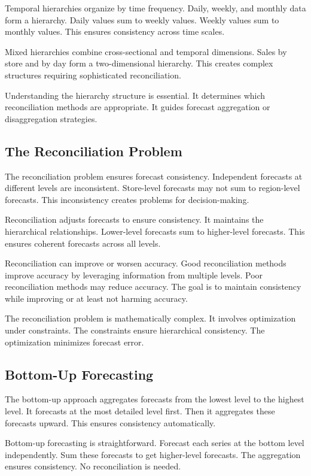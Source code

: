 Temporal hierarchies organize by time frequency. Daily, weekly, and monthly data form a hierarchy. Daily values sum to weekly values. Weekly values sum to monthly values. This ensures consistency across time scales.

Mixed hierarchies combine cross-sectional and temporal dimensions. Sales by store and by day form a two-dimensional hierarchy. This creates complex structures requiring sophisticated reconciliation.

Understanding the hierarchy structure is essential. It determines which reconciliation methods are appropriate. It guides forecast aggregation or disaggregation strategies.

\subsection{The Reconciliation Problem}

The reconciliation problem ensures forecast consistency. Independent forecasts at different levels are inconsistent. Store-level forecasts may not sum to region-level forecasts. This inconsistency creates problems for decision-making.

Reconciliation adjusts forecasts to ensure consistency. It maintains the hierarchical relationships. Lower-level forecasts sum to higher-level forecasts. This ensures coherent forecasts across all levels.

Reconciliation can improve or worsen accuracy. Good reconciliation methods improve accuracy by leveraging information from multiple levels. Poor reconciliation methods may reduce accuracy. The goal is to maintain consistency while improving or at least not harming accuracy.

The reconciliation problem is mathematically complex. It involves optimization under constraints. The constraints ensure hierarchical consistency. The optimization minimizes forecast error.

\subsection{Bottom-Up Forecasting}

The bottom-up approach aggregates forecasts from the lowest level to the highest level. It forecasts at the most detailed level first. Then it aggregates these forecasts upward. This ensures consistency automatically.

Bottom-up forecasting is straightforward. Forecast each series at the bottom level independently. Sum these forecasts to get higher-level forecasts. The aggregation ensures consistency. No reconciliation is needed.

